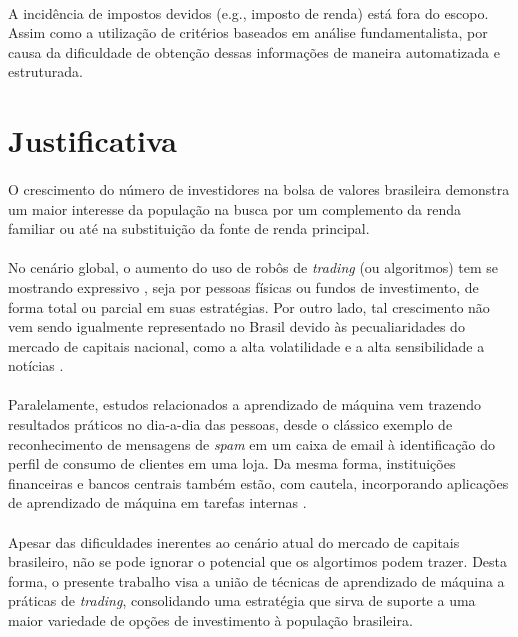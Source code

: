 \paragraph{} A incidência de impostos devidos (e.g., imposto de renda) está fora do escopo. Assim como a utilização de critérios baseados em análise fundamentalista, por causa da dificuldade de obtenção dessas informações de maneira automatizada e estruturada.



\section{Justificativa}

\paragraph{} O crescimento do número de investidores na bolsa de valores brasileira \cite{aumento_investidores} demonstra um maior interesse da população na busca por um complemento da renda familiar ou até na substituição da fonte de renda principal.

\paragraph{} No cenário global, o aumento do uso de robôs de \textit{trading} (ou algoritmos) tem se mostrando expressivo \cite{robos_investidores}, seja por pessoas físicas ou fundos de investimento, de forma total ou parcial em suas estratégias. Por outro lado, tal crescimento não vem sendo igualmente representado no Brasil devido às pecualiaridades do mercado de capitais nacional, como a alta volatilidade e a alta sensibilidade a notícias \cite{robos_e_fundos}.

\paragraph{} Paralelamente, estudos relacionados a aprendizado de máquina vem trazendo resultados práticos no dia-a-dia das pessoas, desde o clássico exemplo de reconhecimento de mensagens de \textit{spam} em um caixa de email à identificação do perfil de consumo de clientes em uma loja. Da mesma forma, instituições financeiras e bancos centrais também estão, com cautela, incorporando aplicações de aprendizado de máquina em tarefas internas \cite{fernandez2019artificial}.

\paragraph{} Apesar das dificuldades inerentes ao cenário atual do mercado de capitais brasileiro, não se pode ignorar o potencial que os algortimos podem trazer. Desta forma, o presente trabalho visa a união de técnicas de aprendizado de máquina a práticas de \textit{trading}, consolidando uma estratégia que sirva de suporte a uma maior variedade de opções de investimento à população brasileira.



